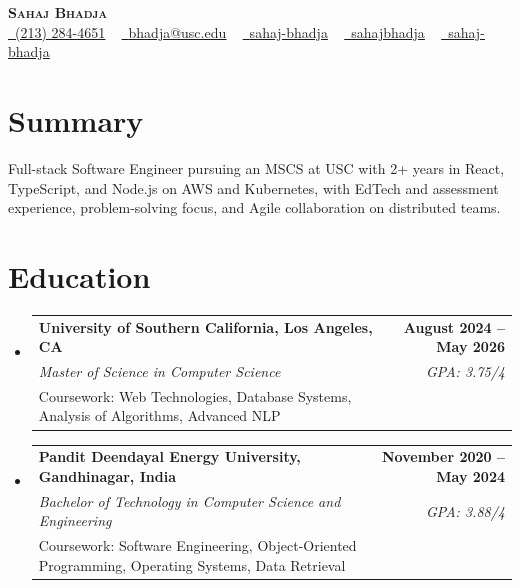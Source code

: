 \documentclass[letterpaper,10pt]{article}
\makeatletter
\newcommand{\resumeEduSubheading}[5]{\vspace{-1pt}\item\begin{tabular*}{1.0\textwidth}[t]{l@{\extracolsep{\fill}}r}\textbf{#1} & \textbf{\small #2} \\\textit{\small #3} & \textit{\small #4} \\\small #5 & \\\end{tabular*}\vspace{-4pt}}
\newcommand{\resumeSubHeadingListStart}{\begin{itemize}[leftmargin=0.0in, label={}]}
\newcommand{\resumeSubHeadingListEnd}{\end{itemize}}
\makeatother
\begin{document}
\begin{center}
{\Huge \scshape \textbf{Sahaj Bhadja}} \\ \vspace{1pt}
\small \href{tel:(213) 284-4651}{\faPhone\ \underline{(213) 284-4651}} ~ \href{mailto: bhadja@usc.edu}{\raisebox{-0.2\height}\faEnvelope\ \underline{bhadja@usc.edu}} ~
\href{https://www.linkedin.com/in/sahaj-bhadja/}{\raisebox{-0.2\height}\faLinkedin\ \underline{sahaj-bhadja}} ~ \href{https://github.com/SAHAJ-BHADJA}{\raisebox{-0.2\height}\faGithub\ \underline{sahajbhadja}} ~
\href{https://sahaj-bhadja.vercel.app/}{\raisebox{-0.2\height}\faGlobe\ \underline{sahaj-bhadja}}
\end{center}
\vspace{-16pt}
\section{Summary}
\begin{itemize}[leftmargin=0.15in, label={}]
\small{\item{Full-stack Software Engineer pursuing an MSCS at USC with 2+ years in React, TypeScript, and Node.js on AWS and Kubernetes, with EdTech and assessment experience, problem-solving focus, and Agile collaboration on distributed teams.}}
\end{itemize}
\vspace{-6pt}
\section{Education}
\resumeSubHeadingListStart
\resumeEduSubheading{University of Southern California, Los Angeles, CA}{August 2024 -- May 2026}{Master of Science in Computer Science}{GPA: 3.75/4}{Coursework: Web Technologies, Database Systems, Analysis of Algorithms, Advanced NLP}
\vspace{-9pt}
\resumeEduSubheading{Pandit Deendayal Energy University, Gandhinagar, India}{November 2020 -- May 2024}{Bachelor of Technology in Computer Science and Engineering}{GPA: 3.88/4}{Coursework: Software Engineering, Object-Oriented Programming, Operating Systems, Data Retrieval}
\resumeSubHeadingListEnd
\vspace{-6pt}
\end{document}

